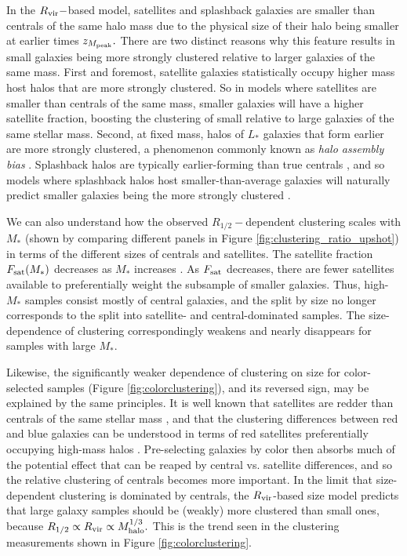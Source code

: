 \documentclass[usenatbib,usegraphicx,letterpaper]{mn2e}
\newcommand{\rhalf}{R_{1/2}}
\newcommand{\mstar}{M_{\ast}}
\newcommand{\zpeak}{z_{M_{\rm peak}}}
\newcommand{\mhalo}{M_{\rm halo}}
\newcommand{\rvir}{R_{\rm vir}}
\begin{document}
In the $\rvir-$based model, satellites and splashback galaxies are smaller than centrals of the same halo mass due to the physical size of their halo being smaller at earlier times $\zpeak.$ There are two distinct reasons why this feature results in small galaxies being more strongly clustered relative to larger galaxies of the same mass. First and foremost, satellite galaxies statistically occupy higher mass host halos that are more strongly clustered. So in models where satellites are smaller than centrals of the same mass, smaller galaxies will have a higher satellite fraction, boosting the clustering of small relative to large galaxies of the same stellar mass. Second, at fixed mass, halos of $L_\ast$ galaxies that form earlier are more strongly clustered, a phenomenon commonly known as {\em halo assembly bias} \citep{gao_white05,wechsler_etal06}. Splashback halos are typically earlier-forming than true centrals \citep{wang_etal09}, and so models where splashback halos host smaller-than-average galaxies will naturally predict smaller galaxies being the more strongly clustered \citep[see, e.g.,][for a demonstration of the splashback-dependence of halo clustering]{sunayama_etal16}.

We can also understand how the observed $\rhalf-$dependent clustering scales with $\mstar$ (shown by comparing different panels in Figure \ref{fig:clustering_ratio_upshot}) in terms of the different sizes of centrals and satellites. The satellite fraction $F_{\rm sat}(\mstar)$ decreases as $\mstar$ increases \citep[e.g.,][]{guo_etal11,reddick_etal13}. As $F_{\rm sat}$ decreases, there are fewer satellites available to preferentially weight the subsample of smaller galaxies. Thus,  high-$\mstar$ samples consist mostly of central galaxies, and the split by size no longer corresponds to the split into satellite- and central-dominated samples. The size-dependence of clustering correspondingly weakens and nearly disappears for samples with large $\mstar$.

Likewise, the significantly weaker dependence of clustering on size for color-selected samples (Figure \ref{fig:colorclustering}), and its reversed sign, may be explained by the same principles.  It is well known that satellites are redder than centrals of the same stellar mass \citep[e.g.,][]{vdB_etal08}, and that the clustering differences between red and blue galaxies can be understood in terms of red satellites preferentially occupying high-mass halos \citep[e.g.,][]{zehavi_etal11}. Pre-selecting galaxies by color then absorbs much of the potential effect that can be reaped by central vs. satellite differences, and so the relative clustering of centrals becomes more important. In the limit that size-dependent clustering is dominated by centrals, the $\rvir$-based size model predicts that large galaxy samples should be (weakly) more clustered than small ones, because $\rhalf\propto\rvir\propto\mhalo^{1/3}.$ This is the trend seen in the clustering measurements shown in Figure \ref{fig:colorclustering}. 
\end{document}
